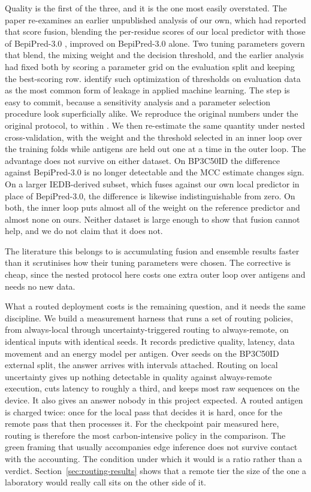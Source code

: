 Quality is the first of the three, and it is the one most easily overstated.
The paper re-examines an earlier unpublished analysis of our own, which
had reported that score fusion, blending the per-residue scores of our local
predictor with those of BepiPred-3.0 \citep{clifford2022bepipred}, improved on
BepiPred-3.0 alone. Two tuning parameters govern that blend, the mixing weight
and the decision threshold, and the earlier analysis had fixed both by scoring
a parameter grid on the evaluation split and keeping the best-scoring row.
\citet{kapoor2023leakage} identify such optimization of thresholds on
evaluation data as the most common form of leakage in applied machine learning.
The step is easy to commit, because a sensitivity analysis and a parameter
selection procedure look superficially alike. We reproduce the original numbers
under the original protocol, to within \TunedBpThreeReplicationMaxDiff{}. We
then re-estimate the same quantity under nested cross-validation, with the
weight and the threshold selected in an inner loop over the training folds
while antigens are held out one at a time in the outer loop.
The advantage does not survive on either dataset. On BP3C50ID the difference
against BepiPred-3.0 is no longer detectable and the MCC estimate changes
sign. On a larger IEDB-derived subset, which fuses against our own local
predictor in place of BepiPred-3.0, the difference is likewise indistinguishable
from zero. On both, the inner loop puts almost all of the weight on the reference
predictor and almost none on ours. Neither dataset is large enough to
show that fusion cannot help, and we do not claim that it does not.

The literature this belongs to is accumulating fusion and ensemble results
faster than it scrutinises how their tuning parameters were chosen. The
corrective is cheap, since the nested protocol here costs one extra outer loop
over antigens and needs no new data.

What a routed deployment costs is the remaining question, and it needs the same
discipline. We build a measurement harness that
runs a set of routing policies, from always-local through uncertainty-triggered
routing to always-remote, on identical inputs with identical seeds. It records
predictive quality, latency, data movement and an energy model per antigen.
Over \NumSeeds{} seeds on the BP3C50ID external split, the answer arrives with
intervals attached. Routing on local uncertainty gives up nothing detectable in
quality against always-remote execution, cuts latency to roughly a third, and
keeps most raw sequences on the device. It also gives an answer
nobody in this project expected. A routed antigen is charged twice: once for
the local pass that decides it is hard, once for the remote pass that then
processes it. For the checkpoint pair measured here, routing is therefore the
most carbon-intensive policy in the comparison. The green framing that usually
accompanies edge inference does not survive contact with the accounting. The
condition under which it would is a ratio rather than a verdict.
Section~\ref{sec:routing-results} shows that a remote tier the size of the one
a laboratory would really call sits on the other side of it.

